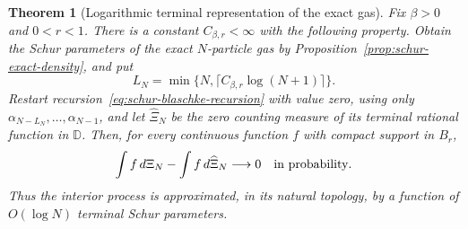 \documentclass[11pt,a4paper]{article}
\numberwithin{equation}{section}
\newtheorem{theorem}{Theorem}[section]
\theoremstyle{definition}
\theoremstyle{remark}
\begin{document}
\begin{theorem}[Logarithmic terminal representation of the exact gas]
\label{thm:schur-logarithmic-memory}
Fix $\beta>0$ and $0<r<1$. There is a constant $C_{\beta,r}<\infty$
with the following property. Obtain the Schur parameters of the
exact $N$-particle gas by Proposition~\ref{prop:schur-exact-density},
and put
\[
 L_N=\min\{N,\lceil C_{\beta,r}\log(N+1)\rceil\}.
\]
Restart recursion~\eqref{eq:schur-blaschke-recursion} with value zero,
using only $\alpha_{N-L_N},\ldots,\alpha_{N-1}$, and let
$\widehat\Xi_N$ be the zero counting measure of its terminal rational
function in $\mathbb D$. Then, for every continuous function $f$
with compact support in $B_r$,
\begin{equation}
 \int f\,d\Xi_N-\int f\,d\widehat\Xi_N
 \longrightarrow0\quad\hbox{in probability}.
 \label{eq:schur-terminal-zero-approximation}
\end{equation}
Thus the interior process is approximated, in its natural topology,
by a function of $O(\log N)$ terminal Schur parameters.
\end{theorem}
\end{document}
